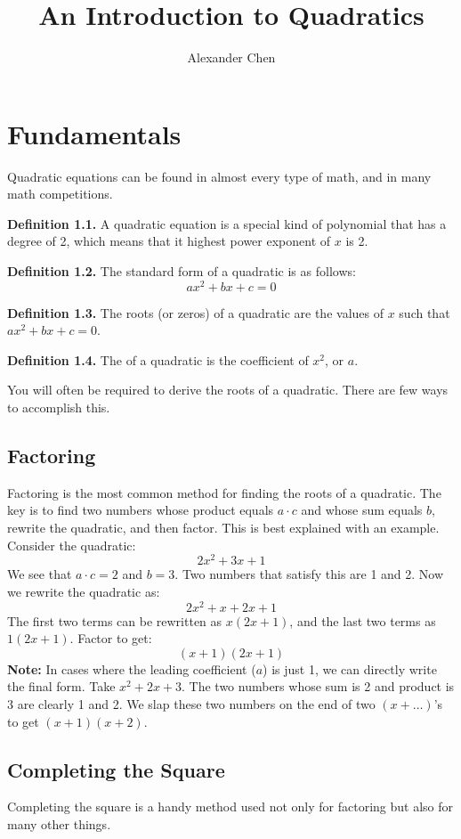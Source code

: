 \documentclass{article}
\title{An Introduction to Quadratics}
\author{Alexander Chen}
\begin{document}
\maketitle

\section{Fundamentals}
Quadratic equations can be found in almost every type of math, and in many math competitions.
\begin{mdframed}
  \textbf{Definition 1.1.} A quadratic equation is a special kind of polynomial that has a degree of 2, which means that it highest power exponent of $x$ is 2.
\end{mdframed}
\begin{mdframed}
  \textbf{Definition 1.2.} The standard form of a quadratic is as follows:
  $$ax^2+bx+c=0$$
\end{mdframed}
\begin{mdframed}
  \textbf{Definition 1.3.} The roots (or zeros) of a quadratic are the values of $x$ such that $ax^2+bx+c=0$.
\end{mdframed}
\begin{mdframed}
  \textbf{Definition 1.4.} The  of a quadratic is the coefficient of $x^2$, or $a$.
\end{mdframed}
You will often be required to derive the roots of a quadratic. There are few ways to accomplish this.

\subsection{Factoring}
Factoring is the most common method for finding the roots of a quadratic. The key is to find two numbers whose product equals $a\cdot c$ and whose sum equals $b$, rewrite the quadratic, and then factor. This is best explained with an example. Consider the quadratic: $$2x^2+3x+1$$
We see that $a \cdot c = 2$ and $b = 3$. Two numbers that satisfy this are 1 and 2. Now we rewrite the quadratic as:
$$2x^2+x+2x+1$$
The first two terms can be rewritten as $x(2x+1)$, and the last two terms as $1(2x+1)$. Factor to get:
$$(x+1)(2x+1)$$
\textbf{Note:} In cases where the leading coefficient ($a$) is just 1, we can directly write the final form. Take $x^2+2x+3$. The two numbers whose sum is 2 and product is 3 are clearly 1 and 2. We slap these two numbers on the end of two $(x + \dots)$'s to get $(x+1)(x+2)$.

\subsection{Completing the Square}
Completing the square is a handy method used not only for factoring but also for many other things.
\end{document}
